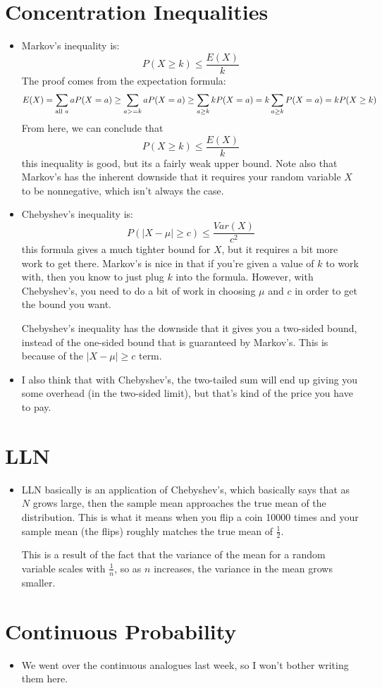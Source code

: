 \documentclass[10pt]{article}
\begin{document}
\section{Concentration Inequalities}
\begin{itemize}
	\item Markov's inequality is:
		 \[
		P(X \ge k) \le \frac{E(X)}{k}
		\] 
		The proof comes from the expectation formula:
		\[
			E(X) = \sum_{\text{all \( a \)}} a P(X = a) \ge \sum_{ a >=k} a P(X = a) \ge \sum_{a \ge k} k
			P(X = a) = k \sum_{a \ge  k} P(X = a) = k P(X \ge k)
		\] 
		From here, we can conclude that 
		\[
		P(X \ge k) \le \frac{E(X)}{k}
		\] 
		this inequality is good, but its a fairly weak upper bound. Note also that Markov's has the inherent 
		downside that it requires your random variable \( X \) to be nonnegative, which isn't always the case. 
	\item Chebyshev's inequality is:
		\[
		P(|X - \mu| \ge c ) \le \frac{Var(X)}{c^2}
		\] 
		this formula gives a much tighter bound for \( X \), but it requires a bit more work to get there. 
		Markov's is nice in that if you're given a value of \( k \) to work with, then you know to just plug 
		\( k \) into the formula. However, with Chebyshev's, you need to do a bit of work in choosing \( \mu \) 
		and \( c \) in order to get the bound you want.  

		Chebyshev's inequality has the downside that it gives you a two-sided bound, instead of the one-sided bound 
		that is guaranteed by Markov's. This is because of the \( |X - \mu| \ge c \) term. 
	\item I also think that with Chebyshev's, the two-tailed sum will end up giving you some overhead (in the 
		two-sided limit), but that's kind of the price you have to pay.  
\end{itemize}
\section{LLN}
\begin{itemize}
	\item LLN basically is an application of Chebyshev's, which basically says that as \( N \) grows large, then the 
		sample mean approaches the true mean of the distribution. This is what it means when you flip a coin 10000 
		times and your sample mean (the flips) roughly matches the true mean of \( \frac{1}{2} \).  

		This is a result of the fact that the variance of the mean for a random variable scales with \( \frac{1}{n} \), 
		so as \( n \) increases, the variance in the mean grows smaller.  
\end{itemize}
\section{Continuous Probability}
\begin{itemize}
	\item We went over the continuous analogues last week, so I won't bother writing them here. 
\end{itemize}
\end{document}
